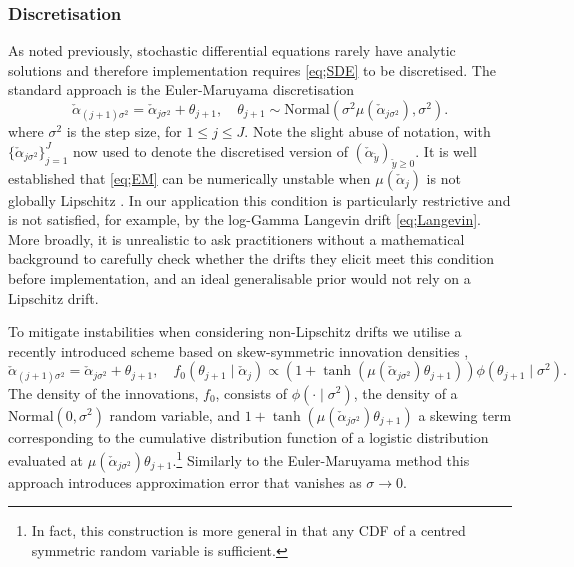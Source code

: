 \documentclass[ba,preprint]{imsart}
\theoremstyle{plain}
\theoremstyle{definition}
\theoremstyle{remark}
\begin{document}
\subsubsection{Discretisation}

As noted previously, stochastic differential equations rarely have analytic solutions and therefore implementation requires \eqref{eq;SDE} to be discretised. The standard approach is the Euler-Maruyama discretisation \citep{Platen2010}
\begin{equation}
    \label{eq;EM}
    \check{\alpha}_{(j+1)\sigma^2} = \check{\alpha}_{j\sigma^2} + \theta_{j+1}, \quad \theta_{j+1} \sim \text{Normal}(\sigma^2\mu(\check{\alpha}_{j\sigma^2}),\sigma^2).
\end{equation}
where $\sigma^2$ is the step size, for $1 \leq j \leq J$. Note the slight abuse of notation, with $\{\check{\alpha}_{j\sigma^2}\}_{j=1}^J$ now used to denote the discretised version of $(\check{\alpha}_{\check{y}})_{{\check{y}}\geq0}$. It is well established that \eqref{eq;EM} can be numerically unstable when $\mu(\check{\alpha}_j)$ is not globally Lipschitz \citep{Roberts1996}. In our application this condition is particularly restrictive and is not satisfied, for example, by the log-Gamma Langevin drift \eqref{eq;Langevin}. More broadly, it is unrealistic to ask practitioners without a mathematical background to carefully check whether the drifts they elicit meet this condition before implementation, and an ideal generalisable prior would not rely on a Lipschitz drift.

To mitigate instabilities when considering non-Lipschitz drifts we utilise a recently introduced scheme based on skew-symmetric innovation densities \citep{Livingstone2024},
\begin{equation}
\label{eq;Barker}
    \check{\alpha}_{(j+1)\sigma^2} = \check{\alpha}_{j\sigma^2} + \theta_{j+1}, \quad f_0(\theta_{j+1}\mid \check{\alpha}_j) \propto \left(1 + \tanh(\mu(\check{\alpha}_{j\sigma^2})\theta_{j+1})\right)\phi(\theta_{j+1}\mid \sigma^2).
\end{equation}
{\color{red}The density of the innovations, $f_0$, consists of $\phi(\cdot\mid\sigma^2)$, the density of a $\text{Normal}(0,\sigma^2)$ random variable, and $1 + \tanh(\mu(\check{\alpha}_{j\sigma^2})\theta_{j+1})$ a} skewing term corresponding to the cumulative distribution function of a logistic distribution evaluated at $\mu(\check{\alpha}_{j\sigma^2})\theta_{j+1}$.\footnote{In fact, this construction is more general in that any CDF of a centred symmetric random variable is sufficient.} Similarly to the Euler-Maruyama method this approach introduces  approximation error that vanishes as $\sigma \to 0$.
\end{document}
